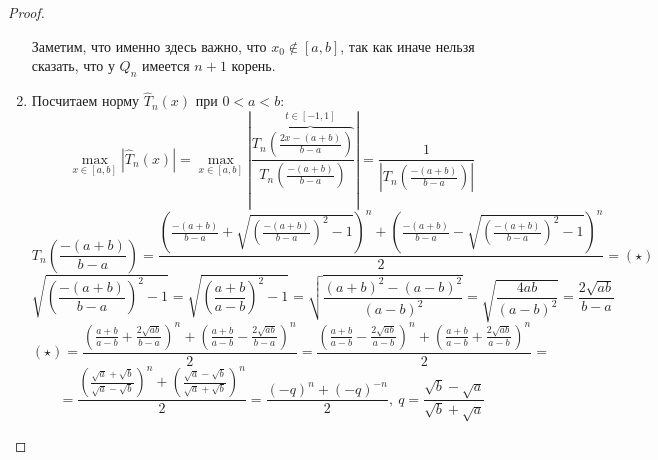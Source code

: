 \begin{proof}
\begin{enumerate}
          Заметим, что именно здесь важно, что $x_0\notin[a,b]$, так как иначе
          нельзя сказать, что у $Q_n$ имеется $n+1$ корень.
    \item Посчитаем норму $\hat{T}_n(x)$ при $0<a<b$:
          \[\max_{x\in[a,b]}|\hat{T}_n(x)|=\max_{x\in[a,b]}\left|\frac{T_n\overbrace{\left(\frac{2x-(a+b)}{b-a}\right)}^{t\in[-1,1]}}{T_n\left(\frac{-(a+b)}{b-a}\right)}\right|=\frac{1}{\left|T_n\left(\frac{-(a+b)}{b-a}\right)\right|}\]
          \[T_n\left(\frac{-(a+b)}{b-a}\right)=\frac{\left(\frac{-(a+b)}{b-a}+\sqrt{\left(\frac{-(a+b)}{b-a}\right)^2-1}\right)^n+\left(\frac{-(a+b)}{b-a}-\sqrt{\left(\frac{-(a+b)}{b-a}\right)^2-1}\right)^n}{2}=(\star)\]
          \[\sqrt{\left(\frac{-(a+b)}{b-a}\right)^2-1}=\sqrt{\left(\frac{a+b}{a-b}\right)^2-1}=\sqrt{\frac{(a+b)^2-(a-b)^2}{(a-b)^2}}=\sqrt{\frac{4ab}{(a-b)^2}}=\frac{2\sqrt{ab}}{b-a}\]
          \[(\star)=\frac{\left(\frac{a+b}{a-b}+\frac{2\sqrt{ab}}{b-a}\right)^n+\left(\frac{a+b}{a-b}-\frac{2\sqrt{ab}}{b-a}\right)^n}{2}=\frac{\left(\frac{a+b}{a-b}-\frac{2\sqrt{ab}}{a-b}\right)^n+\left(\frac{a+b}{a-b}+\frac{2\sqrt{ab}}{a-b}\right)^n}{2}=\]
          \[=\frac{\left(\frac{\sqrt{a}+\sqrt{b}}{\sqrt{a}-\sqrt{b}}\right)^n+\left(\frac{\sqrt{a}-\sqrt{b}}{\sqrt{a}+\sqrt{b}}\right)^n}{2}=\frac{(-q)^n+(-q)^{-n}}{2},\ q=\frac{\sqrt{b}-\sqrt{a}}{\sqrt{b}+\sqrt{a}}\]
  \end{enumerate}
\end{proof}

